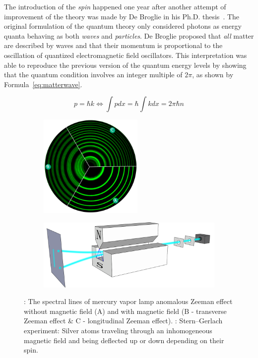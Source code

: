 	The introduction of the \textit{spin} happened one year after another attempt of improvement of the theory was made by De Broglie in his Ph.D. thesis~\cite{DEBROGLIE1924}. The original formulation of the quantum theory only considered photons as energy quanta behaving as both \textit{waves} and \textit{particles}. De Broglie proposed that \textit{all} matter are described by waves and that their momentum is proportional to the oscillation of quantized electromagnetic field oscillators. This interpretation was able to reproduce the previous version of the quantum energy levels by showing that the quantum condition involves an integer multiple of $2\pi$, as shown by Formula~\ref{eq:matterwave}.
	
	\begin{equation}
		\label{eq:matterwave}
		p = \hbar k \Leftrightarrow \int p dx = \hbar\int k dx = 2\pi\hbar n
	\end{equation}
	
\endgroup
	
	\begin{figure}[H]
		\begin{subfigure}{\linewidth}
			\centering
			\includegraphics[height=5cm]{fig/chapt2/ZeemanEffectIllus.png}
			\caption{\label{fig:spin:A}}
		\end{subfigure}
		\begin{subfigure}{\linewidth}
			\centering
			\includegraphics[width = \plotwidth]{fig/chapt2/Stern-Gerlach_experiment.pdf}
			\caption{\label{fig:spin:B}}
		\end{subfigure}
		\caption{\label{fig:spin} : The spectral lines of mercury vapor lamp anomalous Zeeman effect without magnetic field (A) and with magnetic field (B - transverse Zeeman effect \& C - longitudinal Zeeman effect). : Stern–Gerlach experiment: Silver atoms traveling through an inhomogeneous magnetic field and being deflected up or down depending on their spin.}
	\end{figure}
	
